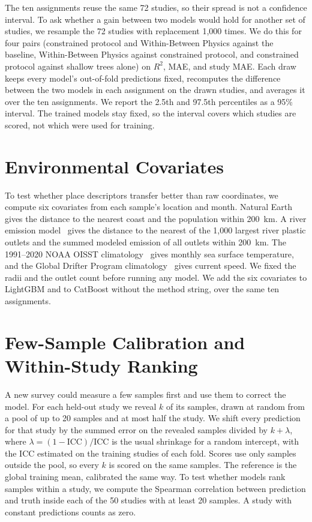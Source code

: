 \documentclass[12pt,a4paper]{report}
\newcommand{\Rsq}{$R^2$}
\begin{document}
The ten assignments reuse the same 72 studies, so their spread is not a confidence interval. To ask whether a gain between two models would hold for another set of studies, we resample the 72 studies with replacement 1,000 times. We do this for four pairs (constrained protocol and Within-Between Physics against the baseline, Within-Between Physics against constrained protocol, and constrained protocol against shallow trees alone) on \Rsq{}, MAE, and study MAE. Each draw keeps every model's out-of-fold predictions fixed, recomputes the difference between the two models in each assignment on the drawn studies, and averages it over the ten assignments. We report the 2.5th and 97.5th percentiles as a 95\% interval. The trained models stay fixed, so the interval covers which studies are scored, not which were used for training.

\section{Environmental Covariates}

To test whether place descriptors transfer better than raw coordinates, we compute six covariates from each sample's location and month. Natural Earth~\cite{naturalearth} gives the distance to the nearest coast and the population within 200~km. A river emission model~\cite{meijer2021} gives the distance to the nearest of the 1,000 largest river plastic outlets and the summed modeled emission of all outlets within 200~km. The 1991--2020 NOAA OISST climatology~\cite{reynolds2002} gives monthly sea surface temperature, and the Global Drifter Program climatology~\cite{laurindo2017} gives current speed. We fixed the radii and the outlet count before running any model. We add the six covariates to LightGBM and to CatBoost without the method string, over the same ten assignments.

\section{Few-Sample Calibration and Within-Study Ranking}

A new survey could measure a few samples first and use them to correct the model. For each held-out study we reveal $k$ of its samples, drawn at random from a pool of up to 20 samples and at most half the study. We shift every prediction for that study by the summed error on the revealed samples divided by $k+\lambda$, where $\lambda=(1-\text{ICC})/\text{ICC}$ is the usual shrinkage for a random intercept, with the ICC estimated on the training studies of each fold. Scores use only samples outside the pool, so every $k$ is scored on the same samples. The reference is the global training mean, calibrated the same way. To test whether models rank samples within a study, we compute the Spearman correlation between prediction and truth inside each of the 50 studies with at least 20 samples. A study with constant predictions counts as zero.
\end{document}
